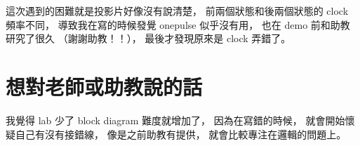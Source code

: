 \documentclass{article}
\begin{document}
\begin{CJK}{UTF8}{bsmi}
這次遇到的困難就是投影片好像沒有說清楚，
前兩個狀態和後兩個狀態的 clock 頻率不同，
導致我在寫的時候發覺 onepulse 似乎沒有用，
也在 demo 前和助教研究了很久
（謝謝助教！！），
最後才發現原來是 clock 弄錯了。

\section{想對老師或助教說的話}
我覺得 lab 少了 block diagram 難度就增加了，
因為在寫錯的時候，
就會開始懷疑自己有沒有接錯線，
像是之前助教有提供，
就會比較專注在邏輯的問題上。

\end{CJK}
\end{document}
